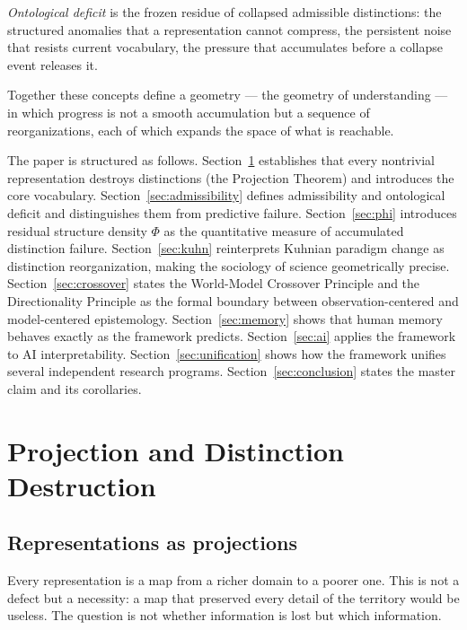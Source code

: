 \documentclass[11pt, a4paper]{article}
\theoremstyle{plain}
\theoremstyle{definition}
\theoremstyle{remark}
\newcommand{\PhiF}{\varPhi}
\begin{document}
\emph{Ontological deficit} is the frozen residue of collapsed
admissible distinctions: the structured anomalies that a
representation cannot compress, the persistent noise that resists
current vocabulary, the pressure that accumulates before a collapse
event releases it.

Together these concepts define a geometry --- the geometry of
understanding --- in which progress is not a smooth accumulation
but a sequence of reorganizations, each of which expands the space
of what is reachable.

The paper is structured as follows.
Section~\ref{sec:projection} establishes that every nontrivial
representation destroys distinctions (the Projection Theorem) and
introduces the core vocabulary.
Section~\ref{sec:admissibility} defines admissibility and ontological
deficit and distinguishes them from predictive failure.
Section~\ref{sec:phi} introduces residual structure density $\PhiF$
as the quantitative measure of accumulated distinction failure.
Section~\ref{sec:kuhn} reinterprets Kuhnian paradigm change as
distinction reorganization, making the sociology of science
geometrically precise.
Section~\ref{sec:crossover} states the World-Model Crossover Principle
and the Directionality Principle as the formal boundary between
observation-centered and model-centered epistemology.
Section~\ref{sec:memory} shows that human memory behaves exactly
as the framework predicts.
Section~\ref{sec:ai} applies the framework to AI interpretability.
Section~\ref{sec:unification} shows how the framework unifies
several independent research programs.
Section~\ref{sec:conclusion} states the master claim and its
corollaries.

\section{Projection and Distinction Destruction}
\label{sec:projection}

\subsection{Representations as projections}

Every representation is a map from a richer domain to a poorer one.
This is not a defect but a necessity: a map that preserved every
detail of the territory would be useless. The question is not whether
information is lost but which information.
\end{document}
